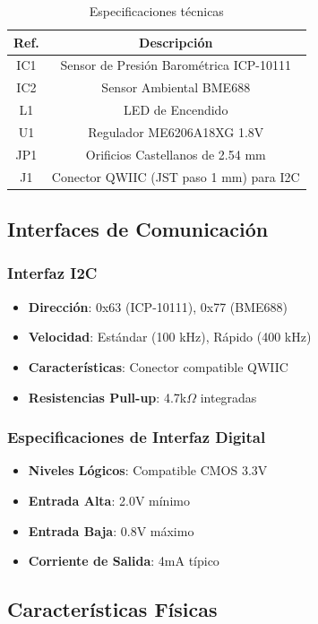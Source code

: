 \documentclass[11pt,a4paper]{article}
\begin{document}
\begin{table}[H]
\centering
\small
\begin{tabular}{|c|c|}
\hline
Ref. & Descripción \\
\hline
IC1 & Sensor de Presión Barométrica ICP-10111 \\
IC2 & Sensor Ambiental BME688 \\
L1 & LED de Encendido \\
U1 & Regulador ME6206A18XG 1.8V \\
JP1 & Orificios Castellanos de 2.54 mm \\
J1 & Conector QWIIC (JST paso 1 mm) para I2C \\
\hline
\end{tabular}
\caption{Especificaciones técnicas}
\end{table}


\subsection{Interfaces de Comunicación}

\subsubsection{Interfaz I2C}
\begin{itemize}
\item \textbf{Dirección}: 0x63 (ICP-10111), 0x77 (BME688)
\item \textbf{Velocidad}: Estándar (100 kHz), Rápido (400 kHz)
\item \textbf{Características}: Conector compatible QWIIC
\item \textbf{Resistencias Pull-up}: 4.7k$\Omega$ integradas
\end{itemize}

\subsubsection{Especificaciones de Interfaz Digital}
\begin{itemize}
\item \textbf{Niveles Lógicos}: Compatible CMOS 3.3V
\item \textbf{Entrada Alta}: 2.0V mínimo
\item \textbf{Entrada Baja}: 0.8V máximo
\item \textbf{Corriente de Salida}: 4mA típico
\end{itemize}

\subsection{Características Físicas}
\end{document}
